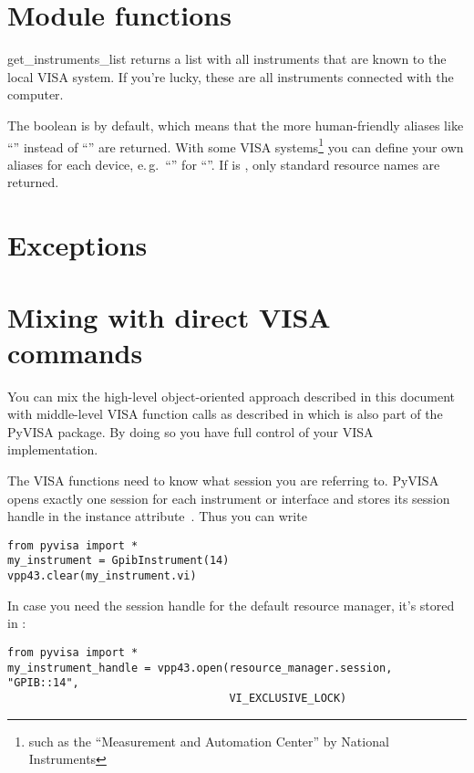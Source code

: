 \documentclass{howto}
\begin{document}
\section{Module functions}

\begin{funcdesc}{get_instruments_list}{}
  returns a list with all instruments that are known to the local VISA system.
  If you're lucky, these are all instruments connected with the computer.

  The boolean  is  by default, which means that the
  more human-friendly aliases like ``'' instead of ``''
  are returned.  With some VISA systems\footnote{such as the ``Measurement and
    Automation Center'' by National Instruments} you can define your own
  aliases for each device, e.\,g.\ ``'' for
  ``''.  If  is , only
  standard resource names are returned.
\end{funcdesc}

\section{Exceptions}


\section{Mixing with direct VISA commands}

You can mix the high-level object-oriented approach described in this document
with middle-level VISA function calls as described in
 which is also part of the PyVISA package.  By doing so you
have full control of your VISA implementation.

The VISA functions need to know what session you are referring to.  PyVISA
opens exactly one session for each instrument or interface and stores its
session handle in the instance attribute~.  Thus you can write
\begin{verbatim}
from pyvisa import *
my_instrument = GpibInstrument(14)
vpp43.clear(my_instrument.vi)
\end{verbatim}

In case you need the session handle for the default resource manager, it's
stored in :
\begin{verbatim}
from pyvisa import *
my_instrument_handle = vpp43.open(resource_manager.session, "GPIB::14",
                                  VI_EXCLUSIVE_LOCK)
\end{verbatim}
\end{document}
